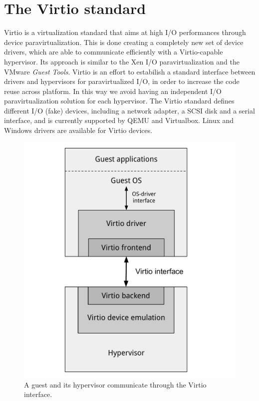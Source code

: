 \section{The Virtio standard}
Virtio is a virtualization standard that aims at high I/O performances through device paravirtualization. This is done creating a completely
new set of device drivers, which are able to communicate efficiently with a Virtio-capable hypervisor. Its approach is
similar to the Xen I/O paravirtualization and the VMware \emph{Guest Tools}.
Virtio is an effort to estabilish a standard interface between drivers and hypervisors for paravirtualized I/O, in order to increase the 
code reuse across platform. In this way we avoid having an independent I/O paravirtualization solution for each hypervisor.
The Virtio standard defines different I/O (fake) devices, including a network adapter, a SCSI disk and a serial interface, and is currently
supported by QEMU and Virtualbox. Linux and Windows drivers are available for Virtio devices.

\begin{figure}[bt]
\centering
\includegraphics[scale = 0.45]{virtio.pdf}
\caption{A guest and its hypervisor communicate through the Virtio interface.}
\label{fig:virtio}
\end{figure}

